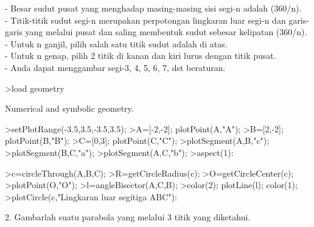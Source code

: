 \documentclass[a4paper,10pt]{article}
\begin{document}
\begin{eulernotebook}
\begin{eulercomment}
\begin{eulercomment}
\begin{eulercomment}
\begin{eulercomment}
\begin{eulercomment}
\begin{eulercomment}
\begin{eulercomment}
\begin{eulercomment}
\begin{eulercomment}
\begin{eulercomment}
\begin{eulercomment}
\begin{eulercomment}
\begin{eulercomment}
\begin{eulercomment}
\begin{eulercomment}
\begin{eulercomment}
\begin{eulercomment}
\begin{eulercomment}
\begin{eulercomment}
- Besar sudut pusat yang menghadap masing-masing sisi segi-n adalah
(360/n).\\
- Titik-titik sudut segi-n merupakan perpotongan lingkaran luar segi-n
dan garis-garis yang melalui pusat dan saling membentuk sudut sebesar
kelipatan (360/n).\\
- Untuk n ganjil, pilih salah satu titik sudut adalah di atas.\\
- Untuk n genap, pilih 2 titik di kanan dan kiri lurus dengan titik
pusat.\\
- Anda dapat menggambar segi-3, 4, 5, 6, 7, dst beraturan.
\end{eulercomment}
\begin{eulerprompt}
>load geometry
\end{eulerprompt}
\begin{euleroutput}
  Numerical and symbolic geometry.
\end{euleroutput}
\begin{eulerprompt}
>setPlotRange(-3.5,3.5,-3.5,3.5);
>A=[-2,-2]; plotPoint(A,"A");
>B=[2,-2]; plotPoint(B,"B");
>C=[0,3]; plotPoint(C,"C");
>plotSegment(A,B,"c");
>plotSegment(B,C,"a");
>plotSegment(A,C,"b");
>aspect(1):
\end{eulerprompt}
\begin{eulerprompt}
>c=circleThrough(A,B,C);
>R=getCircleRadius(c);
>O=getCircleCenter(c);
>plotPoint(O,"O");
>l=angleBisector(A,C,B);
>color(2); plotLine(l); color(1);
>plotCircle(c,"Lingkaran luar segitiga ABC"):
\end{eulerprompt}
\begin{eulercomment}
2. Gambarlah suatu parabola yang melalui 3 titik yang diketahui.


\end{eulercomment}
\end{eulercomment}
\end{eulercomment}
\end{eulercomment}
\end{eulercomment}
\end{eulercomment}
\end{eulercomment}
\end{eulercomment}
\end{eulercomment}
\end{eulercomment}
\end{eulercomment}
\end{eulercomment}
\end{eulercomment}
\end{eulercomment}
\end{eulercomment}
\end{eulercomment}
\end{eulercomment}
\end{eulercomment}
\end{eulercomment}
\end{eulernotebook}
\end{document}
